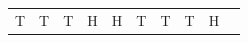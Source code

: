 {{\begin{center}
\begin{xtabular}[t]{|l|l|l|l|l|l|l|l|l|l|}
    
        T &
    
    
        T &
    
    
        T &
    
    
        H &
    
    
        H &
    
    
        T &
    
    
        T &
    
    
        T &
    
    
        H &
    
    

\end{xtabular}
\end{center}}}
